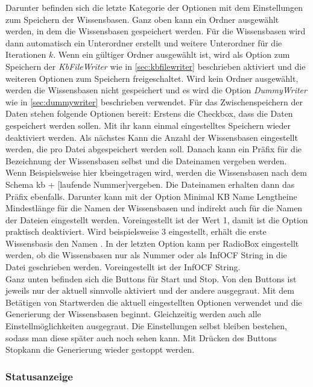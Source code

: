 \documentclass[12pt,a4paper]{article}
\begin{document}
Darunter befinden sich die letzte Kategorie der Optionen mit dem Einstellungen zum Speichern der Wissensbasen. Ganz oben kann ein Ordner ausgewählt werden, in dem die Wissensbasen gespeichert werden. Für die Wissensbasen wird dann automatisch ein Unterordner erstellt und weitere Unterordner für die Iterationen $k$. Wenn ein gültiger Ordner ausgewählt ist, wird als Option zum Speichern der \textit{KbFileWriter} wie in \autoref{sec:kbfilewriter} beschrieben aktiviert und die weiteren Optionen zum Speichern freigeschaltet. Wird kein Ordner ausgewählt, werden die Wissensbasen nicht gespeichert und es wird die Option \textit{DummyWriter} wie in \autoref{sec:dummywriter} beschrieben verwendet. Für das Zwischenspeichern der Daten stehen folgende Optionen bereit: Erstens die Checkbox, dass die Daten gespeichert werden sollen. Mit ihr kann einmal eingestelltes Speichern wieder deaktiviert werden. Als nächstes Kann die Anzahl der Wissensbasen eingestellt werden, die pro Datei abgespeichert werden soll. Danach kann ein Präfix für die Bezeichnung der Wissensbasen selbst  und die Dateinamen vergeben werden. Wenn Beispielsweise hier \glqq kb\grqq \space eingetragen wird, werden die Wissensbasen nach dem Schema \glqq kb + [laufende Nummer]\grqq \space vergeben. Die Dateinamen erhalten dann das Präfix ebenfalls. Darunter kann mit der Option \glqq Minimal KB Name Length\grqq \space eine Mindestlänge für die Namen der Wissensbasen und indirekt auch für die Namen der Dateien eingestellt werden. Voreingestellt ist der Wert 1, damit ist die Option praktisch deaktiviert. Wird beispielsweise 3 eingestellt, erhält die erste Wissensbasis den Namen \grqq . In der letzten Option kann per RadioBox eingestellt werden, ob die Wissensbasen nur als Nummer oder als InfOCF String in die Datei geschrieben werden. Voreingestellt ist der InfOCF String.\\
Ganz unten befinden sich die Buttons für Start und Stop. Von den Buttons ist jeweils nur der aktuell sinnvolle aktiviert und der andere ausgegraut. Mit dem Betätigen von \glqq Start\grqq \space werden die aktuell eingestellten Optionen verwendet und die Generierung der Wissensbasen beginnt. Gleichzeitig werden auch alle Einstellmöglichkeiten ausgegraut. Die Einstellungen selbst bleiben bestehen, sodass man diese später auch noch sehen kann. Mit Drücken des Buttons \glqq Stop\grqq \space kann die Generierung wieder gestoppt werden.


\subsubsection{Statusanzeige}
\end{document}

